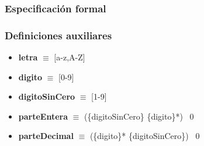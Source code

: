 \documentclass[11pt]{article}
\begin{document}
        \subsubsection{Especificación formal}
        \subsubsection*{Definiciones auxiliares}
        \begin{itemize}
            \item \textbf{letra }$\equiv$ [a-z,A-Z]
            \item \textbf{digito }$\equiv$ [0-9]
            \item \textbf{digitoSinCero }$\equiv$ [1-9]
            \item \textbf{parteEntera }$\equiv$ (\{digitoSinCero\} \{digito\}*) \textbar\ 0
            \item \textbf{parteDecimal }$\equiv$ (\{digito\}* \{digitoSinCero\}) \textbar\ 0
        \end{itemize}
\end{document}
